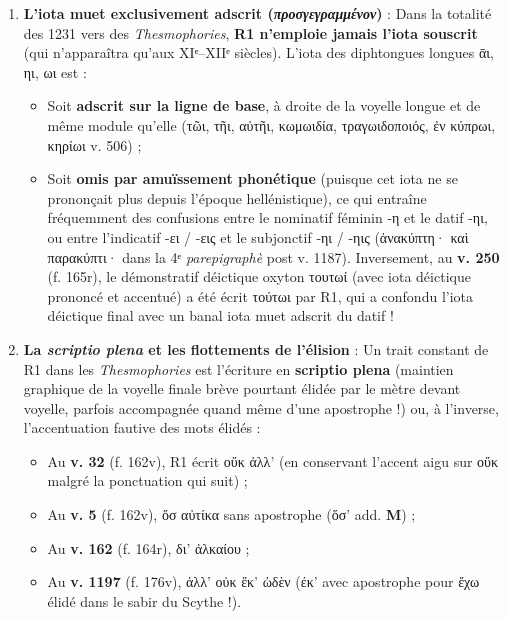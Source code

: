 \documentclass[11pt, a4paper, twoside]{article}
\renewcommand{\_}{\origunderscore\penalty0\relax}
\renewcommand{\texttt}[1]{#1}
\newcommand{\Run}{\textbf{R}\textsuperscript{1}}
\newcommand{\M}{\textbf{M}}
\def\Run{R1}%
\begin{document}
\begin{enumerate}[leftmargin=1.6em, itemsep=2pt]
  \item \textbf{L'iota muet exclusivement adscrit (\textit{προσγεγραμμένον})} : Dans la totalité des 1231 vers des \textit{Thesmophories}, \textbf{\Run{} n'emploie jamais l'iota souscrit} (qui n'apparaîtra qu'aux XIᵉ–XIIᵉ siècles). L'iota des diphtongues longues ᾱι, ηι, ωι est :
  \begin{itemize}[leftmargin=1.5em, itemsep=2pt]
    \item Soit \textbf{adscrit sur la ligne de base}, à droite de la voyelle longue et de même module qu'elle (\texttt{τῶι}, \texttt{τῆι}, \texttt{αὐτῆι}, \texttt{κωμωιδία}, \texttt{τραγωιδοποιός}, \texttt{ἐν κύπρωι}, \texttt{κηρίωι} v. 506) ;
    \item Soit \textbf{omis par amuïssement phonétique} (puisque cet iota ne se prononçait plus depuis l'époque hellénistique), ce qui entraîne fréquemment des confusions entre le nominatif féminin -η et le datif -ηι, ou entre l'indicatif -ει / -εις et le subjonctif -ηι / -ηις (\texttt{ἀνακύπτη· καὶ παρακύπτι·} dans la 4ᵉ \textit{parepigraphè} post v. 1187). Inversement, au \textbf{v. 250} (\texttt{f. 165r}), le démonstratif déictique oxyton \texttt{τουτωί} (avec iota déictique prononcé et accentué) a été écrit \texttt{τούτωι} par \Run{}, qui a confondu l'iota déictique final avec un banal iota muet adscrit du datif !
  \end{itemize}

  \item \textbf{La \textit{scriptio plena} et les flottements de l'élision} : Un trait constant de \Run{} dans les \textit{Thesmophories} est l'écriture en \textbf{scriptio plena} (maintien graphique de la voyelle finale brève pourtant élidée par le mètre devant voyelle, parfois accompagnée quand même d'une apostrophe !) ou, à l'inverse, l'accentuation fautive des mots élidés :
  \begin{itemize}[leftmargin=1.5em, itemsep=2pt]
    \item Au \textbf{v. 32} (\texttt{f. 162v}), \Run{} écrit \texttt{οὔκ ἀλλ'} (en conservant l'accent aigu sur \texttt{οὔκ} malgré la ponctuation qui suit) ;
    \item Au \textbf{v. 5} (\texttt{f. 162v}), \texttt{ὅσ αὐτίκα} sans apostrophe (\texttt{ὅσ'} add. \M{}) ;
    \item Au \textbf{v. 162} (\texttt{f. 164r}), \texttt{δι' ἀλκαίου} ;
    \item Au \textbf{v. 1197} (\texttt{f. 176v}), \texttt{ἀλλ' οὐκ ἔκ' ὠδὲν} (\texttt{έκ'} avec apostrophe pour \texttt{ἔχω} élidé dans le sabir du Scythe !).
  \end{itemize}
\end{enumerate}
\end{document}
